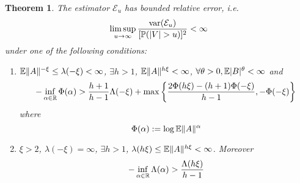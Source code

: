 \documentclass{article}
\newtheorem{theorem}{Theorem}
\theoremstyle{remark}
\begin{document}
\begin{theorem}
  The estimator $\mathcal E_u$ has bounded relative error, i.e.
  \begin{equation*}
    \limsup_{u \to \infty} {\text{var}(\mathcal E_u) \over [\mathbb{P}(|V| > u)]^2} < \infty
  \end{equation*}
  under one of the following conditions:
  \begin{enumerate}
  \item $\mathbb{E} \|A\|^{-\xi} \leq \lambda(-\xi) < \infty$, $\exists h > 1$,
    $\mathbb{E}\|A\|^{h\xi} < \infty$,
    $\forall \theta > 0, \mathbb{E} |B|^{\theta} < \infty$ and
    \begin{equation}
      \label{eq:deepness}
      -\inf_{\alpha \in \mathbb R} \Phi(\alpha)
      >
      {
        h+1
        \over
        h-1
      } \Lambda(-\xi)
      +
      \max\left\{
      {
        2 \Phi(h\xi) - (h+1) \Phi(-\xi)
        \over
        h-1
      },
      -\Phi(-\xi)
      \right\}
    \end{equation}
    where
    \[
    \Phi(\alpha) := \log \mathbb{E} \|A\|^{\alpha}
    \]
    \label{assumptions:1}
  \item $\xi > 2$, $\lambda(-\xi) = \infty$, $\exists h > 1$,
    $\lambda(h\xi) \leq \mathbb{E}\|A\|^{h\xi} < \infty$. Moreover
    \begin{equation}
      \label{eq:deepness2}
      -\inf_{\alpha \in \mathbb R} \Lambda(\alpha) > {
        \Lambda(h\xi)
        \over
        h - 1
      }
    \end{equation}
    \label{assumptions:2}    
  \end{enumerate}
\end{theorem}
\end{document}

